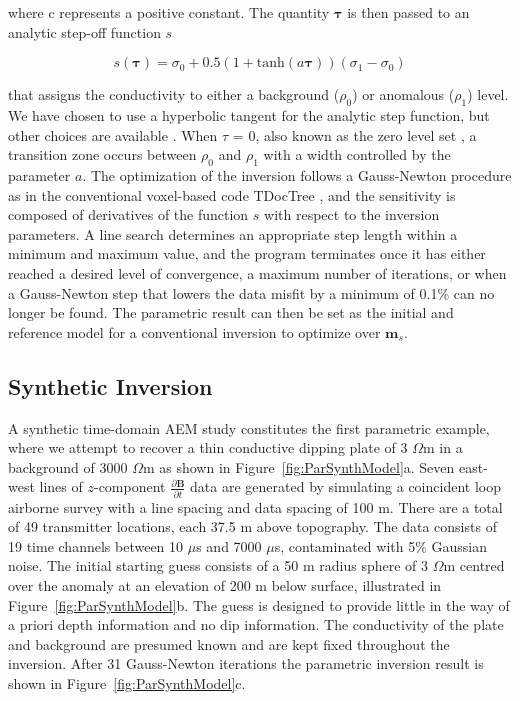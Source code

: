 \documentclass[letterpaper,11pt]{article}
\begin{document}
where c represents a positive constant. The quantity $\boldsymbol{\tau}$ is then passed to an analytic step-off function $ \mathit{s} $

\begin{equation}
s(\boldsymbol{\tau}) = \sigma_0 + 0.5\left(1 + \mathrm{tanh}(a\boldsymbol{\tau})\right)(\sigma_1-\sigma_0)
\label{eq:stepFunction}
\end{equation}

 
that assigns the conductivity to either a background ($ \rho_0 $) or anomalous ($ \rho_1 $) level. We have chosen to use a hyperbolic tangent for the analytic step function, but other choices are available \cite[]{Tai2004}.  When $ \tau $ = 0, also known as the zero level set \cite[]{Osher1988}, a transition zone occurs between $ \rho_0 $ and $ \rho_1 $ with a width controlled by the parameter $ a $. The optimization of the inversion follows a Gauss-Newton procedure as in the conventional voxel-based code TDocTree \cite[]{Haber2014}, and the sensitivity is composed of derivatives of the function $ s $ with respect to the inversion parameters.  A line search determines an appropriate step length within a minimum and maximum value, and the program terminates once it has either reached a desired level of convergence, a maximum number of iterations, or when a Gauss-Newton step that lowers the data misfit by a minimum of 0.1\% can no longer be found. The parametric result can then be set as the initial and reference model for a conventional inversion to optimize over $ \mathbf{m}_s $.


\subsection{Synthetic Inversion}
A synthetic time-domain AEM study constitutes the first parametric example, where we attempt to recover a thin conductive dipping plate of 3 $ \Omega $m in a background of 3000 $ \Omega $m as shown in Figure~\ref{fig:ParSynthModel}a. Seven east-west lines of $ z $-component $ \frac{\partial\mathbf{B}}{\partial t} $ data are generated by simulating a coincident loop airborne survey with a line spacing and data spacing of 100 m.  There are a total of 49 transmitter locations, each 37.5 m above topography. The data consists of 19 time channels between 10 $ \mu $s and 7000 $ \mu $s, contaminated with 5\% Gaussian noise. The initial starting guess consists of a 50 m radius sphere of 3 $ \Omega $m centred over the anomaly at an elevation of 200 m below surface, illustrated in Figure~\ref{fig:ParSynthModel}b. The guess is designed to provide little in the way of a priori depth information and no dip information. The conductivity of the plate and background are presumed known and are kept fixed throughout the inversion. After 31 Gauss-Newton iterations the parametric inversion result is shown in Figure~\ref{fig:ParSynthModel}c.
\end{document}
